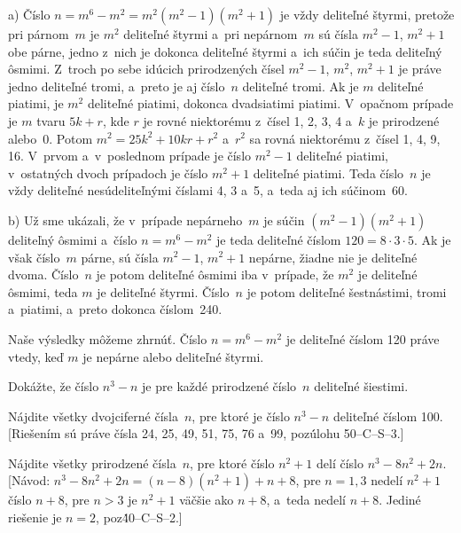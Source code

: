 {%
a) Číslo $n = m^6-m^2 = m^2(m^2-1)(m^2+1)$ je
vždy deliteľné štyrmi, pretože pri párnom~$m$ je $m^2$ deliteľné
štyrmi a~pri nepárnom~$m$ sú čísla $m^2-1$, $m^2+1$ obe
párne, jedno z~nich je dokonca deliteľné štyrmi a~ich súčin je
teda deliteľný ôsmimi. Z~troch po sebe idúcich prirodzených čísel
$m^2-1$, $m^2$, $m^2+1$ je práve jedno deliteľné
tromi, a~preto je aj číslo~$n$ deliteľné tromi. Ak je $m$
deliteľné piatimi, je $m^2$ deliteľné piatimi, dokonca dvadsiatimi piatimi.
V~opačnom prípade je $m$ tvaru $5k+r$, kde $r$ je rovné
niektorému z~čísel 1, 2, 3, 4 a~$k$ je prirodzené alebo~0. Potom
$m^2 = 25k^2+10kr+r^2$ a~$r^2$ sa rovná niektorému 
z~čísel 1, 4, 9, 16. V~prvom a~v~poslednom prípade je číslo $m^2-1$
deliteľné piatimi, v~ostatných dvoch prípadoch je číslo $m^2+1$
deliteľné piatimi. Teda číslo~$n$ je vždy deliteľné nesúdeliteľnými
číslami 4, 3 a~5, a~teda aj ich súčinom~60.

\smallskip
b) Už sme ukázali, že v~prípade nepárneho~$m$ je súčin
$(m^2-1)(m^2+1)$ deliteľný ôsmimi a~číslo $n=m^6-m^2$
je teda deliteľné číslom $120 = 8\cdot3\cdot5$. Ak je však číslo~$m$
párne, sú čísla $m^2-1$, $m^2+1$ nepárne, žiadne nie je
deliteľné dvoma. Číslo~$n$ je potom deliteľné ôsmimi iba v~prípade,
že $m^2$ je deliteľné ôsmimi, teda $m$ je deliteľné štyrmi. 
Číslo~$n$ je potom deliteľné šestnástimi, tromi
a~piatimi, a~preto dokonca číslom~240.

Naše výsledky môžeme zhrnúť. Číslo $n = m^6 - m^2$ je
deliteľné číslom 120 práve vtedy, keď $m$ je nepárne alebo deliteľné
štyrmi.


Dokážte, že číslo $n^3-n$ je pre každé prirodzené číslo~$n$
deliteľné šiestimi.

Nájdite všetky dvojciferné čísla~$n$, pre ktoré je číslo $n^3-n$
deliteľné číslom 100. [Riešením sú práve čísla 24, 25, 49,
51, 75, 76 a~99, poz\. úlohu 50--C--S--3.]

Nájdite všetky prirodzené čísla~$n$, pre ktoré číslo $n^2+1$
delí číslo $n^3-8n^2+2n$. [Návod: $n^3-8n^2+2n = (n-8)(n^2+1)+n+8$,
pre $n = 1, 3$ nedelí $n^2+1$ číslo $n+8$, pre $n>3$ je $n^2+1$ väčšie
ako $n+8$, a~teda nedelí $n+8$. Jediné riešenie je $n=2$, poz\. 40--C--S--2.]
}

